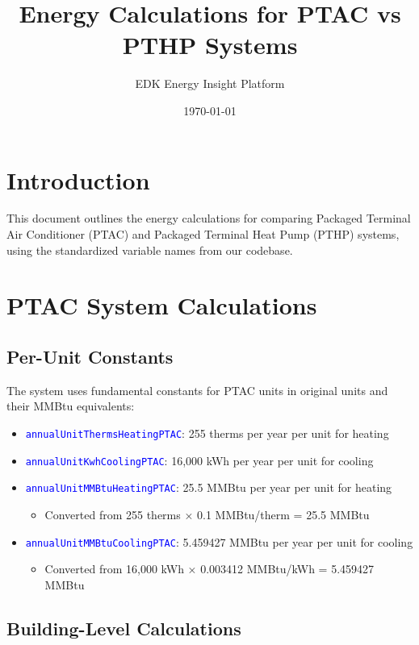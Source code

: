 \documentclass{article}
\title{Energy Calculations for PTAC vs PTHP Systems}
\author{EDK Energy Insight Platform}
\date{\today}
\newcommand{\code}[1]{\textcolor{blue}{\texttt{#1}}}
\begin{document}
\maketitle

\section{Introduction}

This document outlines the energy calculations for comparing Packaged Terminal Air Conditioner (PTAC) and Packaged Terminal Heat Pump (PTHP) systems, using the standardized variable names from our codebase.

\section{PTAC System Calculations}

\subsection{Per-Unit Constants}

The system uses fundamental constants for PTAC units in original units and their MMBtu equivalents:

\begin{itemize}
    \item \code{annualUnitThermsHeatingPTAC}: 255 therms per year per unit for heating
    \item \code{annualUnitKwhCoolingPTAC}: 16,000 kWh per year per unit for cooling
    \item \code{annualUnitMMBtuHeatingPTAC}: 25.5 MMBtu per year per unit for heating
        \begin{itemize}
            \item Converted from 255 therms × 0.1 MMBtu/therm = 25.5 MMBtu
        \end{itemize}
    \item \code{annualUnitMMBtuCoolingPTAC}: 5.459427 MMBtu per year per unit for cooling
        \begin{itemize}
            \item Converted from 16,000 kWh × 0.003412 MMBtu/kWh = 5.459427 MMBtu
        \end{itemize}
\end{itemize}

\subsection{Building-Level Calculations}
\end{document}
